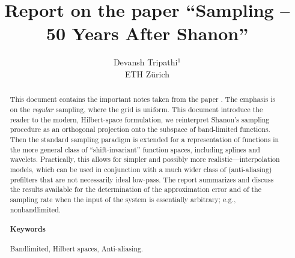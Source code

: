 \documentclass[reqno,9pt]{amsart}
\title{Report on the paper ``Sampling -- 50 Years After Shanon''}
\author{Devansh Tripathi$^1$ \\ ETH Z\lowercase{\"urich}}
\theoremstyle{plain}
\theoremstyle{definition}
\begin{document}

\begin{abstract}
    This document contains the important notes taken from the paper \cite{MU2000}. The emphasis is on the {\it regular} sampling, where the grid is uniform. This document introduce the reader to the modern, Hilbert-space formulation, we reinterpret Shanon's sampling procedure as an orthogonal projection onto the subspace of band-limited functions. Then the standard sampling paradigm is extended for a representation of functions in the more general class of ``shift-invariant'' function spaces, including splines and wavelets.  Practically, this allows for simpler and possibly more realistic—interpolation models, which can be used in conjunction with a much wider class of (anti-aliasing) prefilters that are not necessarily ideal low-pass. The report summarizes and discuss the results available for the determination of the approximation error and of the sampling rate when the input of the system is essentially arbitrary; e.g., nonbandlimited.

    \vspace{1em}
    \paragraph{\bf Keywords} Bandlimited, Hilbert spaces, Anti-aliasing.
\end{abstract}
\maketitle
\end{document}
